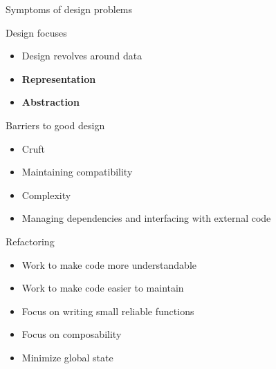 \begin{frame}{Symptoms of design problems}


\end{frame}

\begin{frame}{Design focuses}

\begin{itemize}
\tightlist
\item
  Design revolves around data
\item
  \textbf{Representation}
\item
  \textbf{Abstraction}
\end{itemize}

\end{frame}

\begin{frame}{Barriers to good design}

\begin{itemize}
\tightlist
\item
  Cruft
\item
  Maintaining compatibility
\item
  Complexity
\item
  Managing dependencies and interfacing with external code
\end{itemize}

\end{frame}

\begin{frame}{Refactoring}

\begin{itemize}
\tightlist
\item
  Work to make code more understandable
\item
  Work to make code easier to maintain
\item
  Focus on writing small reliable functions
\item
  Focus on composability
\item
  Minimize global state
\end{itemize}

\end{frame}

